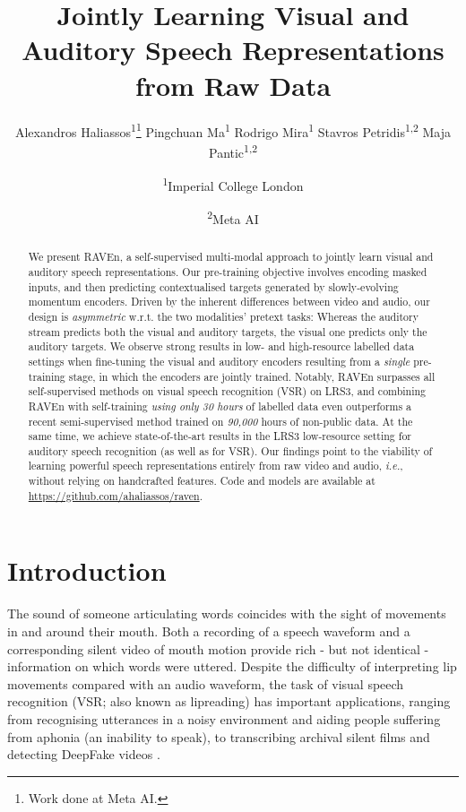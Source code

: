 \documentclass{article} \usepackage{iclr2023_conference,times}
\title{Jointly Learning Visual and Auditory Speech Representations from Raw Data}
\author{Alexandros Haliassos\textsuperscript{1}\thanks{Work done at Meta AI.}\hspace{-0.15cm}
\And
Pingchuan Ma\textsuperscript{1}\hspace{-0.3cm}
\And
Rodrigo Mira\textsuperscript{1}\hspace{-0.3cm}
\And
Stavros Petridis\textsuperscript{1,2}\hspace{-0.3cm}
\And
Maja Pantic\textsuperscript{1,2} \vspace{0.2cm}
\and
\hspace{3.5cm}\textsuperscript{1}Imperial College London
\and
\textsuperscript{2}Meta AI \hspace{3.5cm} \vspace{0.2cm}
\and
\hspace{2.9cm}{\tt alexandros.haliassos14@imperial.ac.uk}
}
\begin{document}
\maketitle

\begin{abstract}
We present RAVEn, a self-supervised multi-modal approach to jointly learn visual and auditory speech representations. Our pre-training objective involves encoding masked inputs, and then predicting contextualised targets generated by slowly-evolving momentum encoders. Driven by the inherent differences between video and audio, our design is \textit{asymmetric} w.r.t. the two modalities' pretext tasks: Whereas the auditory stream predicts both the visual and auditory targets, the visual one predicts only the auditory targets. We observe strong results in low- and high-resource labelled data settings when fine-tuning the visual and auditory encoders resulting from a \textit{single} pre-training stage, in which the encoders are jointly trained. Notably, RAVEn surpasses all self-supervised methods on visual speech recognition (VSR) on LRS3, and combining RAVEn with self-training \textit{using only 30 hours} of labelled data even outperforms a recent semi-supervised method trained on \textit{90,000} hours of non-public data. At the same time, we achieve state-of-the-art results in the LRS3 low-resource setting for auditory speech recognition (as well as for VSR). Our findings point to the viability of learning powerful speech representations entirely from raw video and audio, \textit{i.e.}, without relying on handcrafted features. Code and models are available at \url{https://github.com/ahaliassos/raven}.
\end{abstract}

\section{Introduction}

The sound of someone articulating words coincides with the sight of movements in and around their mouth. Both a recording of a speech waveform and a corresponding silent video of mouth motion provide rich - but not identical - information on which words were uttered. Despite the difficulty of interpreting lip movements compared with an audio waveform, the task of visual speech recognition (VSR; also known as lipreading) has important applications, ranging from recognising utterances in a noisy environment \citep{ma2021end, afouras2018deep, martinez2020lipreading, makino2019recurrent} and aiding people suffering from aphonia (an inability to speak), to transcribing archival silent films and detecting DeepFake videos \citep{haliassos2021lips}.
\end{document}
